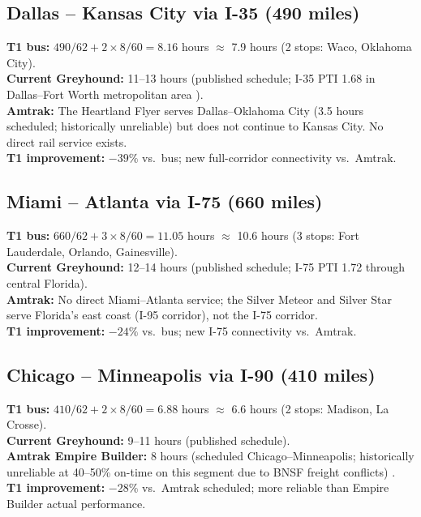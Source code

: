 \subsection{Dallas -- Kansas City via I-35 (490 miles)}

\textbf{T1 bus:} $490 / 62 + 2 \times 8/60 = 8.16$ hours $\approx$ 7.9 hours (2 stops: Waco, Oklahoma City). \\
\textbf{Current Greyhound:} 11--13 hours (published schedule; I-35 PTI 1.68 in Dallas--Fort Worth metropolitan area \citep{ATRI_bottleneck2023}). \\
\textbf{Amtrak:} The Heartland Flyer serves Dallas--Oklahoma City (3.5 hours scheduled; historically unreliable) but does not continue to Kansas City. No direct rail service exists. \\
\textbf{T1 improvement:} $-39\%$ vs.\ bus; new full-corridor connectivity vs.\ Amtrak.

\subsection{Miami -- Atlanta via I-75 (660 miles)}

\textbf{T1 bus:} $660 / 62 + 3 \times 8/60 = 11.05$ hours $\approx$ 10.6 hours (3 stops: Fort Lauderdale, Orlando, Gainesville). \\
\textbf{Current Greyhound:} 12--14 hours (published schedule; I-75 PTI 1.72 through central Florida). \\
\textbf{Amtrak:} No direct Miami--Atlanta service; the Silver Meteor and Silver Star serve Florida's east coast (I-95 corridor), not the I-75 corridor. \\
\textbf{T1 improvement:} $-24\%$ vs.\ bus; new I-75 connectivity vs.\ Amtrak.

\subsection{Chicago -- Minneapolis via I-90 (410 miles)}

\textbf{T1 bus:} $410 / 62 + 2 \times 8/60 = 6.88$ hours $\approx$ 6.6 hours (2 stops: Madison, La Crosse). \\
\textbf{Current Greyhound:} 9--11 hours (published schedule). \\
\textbf{Amtrak Empire Builder:} 8 hours (scheduled Chicago--Minneapolis; historically unreliable at 40--50\% on-time on this segment due to BNSF freight conflicts) \citep{Amtrak2023}. \\
\textbf{T1 improvement:} $-28\%$ vs.\ Amtrak scheduled; more reliable than Empire Builder actual performance.

